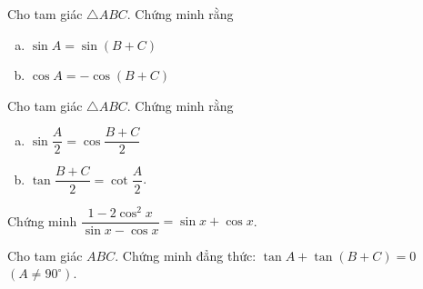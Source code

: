 \begin{bt}%
	Cho tam giác $\triangle ABC$. Chứng minh rằng
	\begin{enumerate}[a)]
		\item $\sin A=\sin (B+C)$
		\item $\cos A = -\cos (B+C)$
	\end{enumerate}
\end{bt}

\begin{bt}%
	Cho tam giác $\triangle ABC$. Chứng minh rằng
	\begin{enumerate}[a)]
		\item $\sin \dfrac{A}{2} = \cos \dfrac{B+C}{2}$\item $\tan \dfrac{B+C}{2}=\cot \dfrac{A}{2}$. 
	\end{enumerate}
\end{bt}

\begin{bt}%
	Chứng minh $\dfrac{1-2\cos^2x}{\sin x-\cos x}=\sin x+\cos x$.
	\dapso{}
\end{bt}

\begin{bt}%
	Cho tam giác $ABC$. Chứng minh đẳng thức: $\tan A+\tan(B+C)=0$ $\left(A\neq 90^{\circ}\right)$. 
	
\end{bt}

